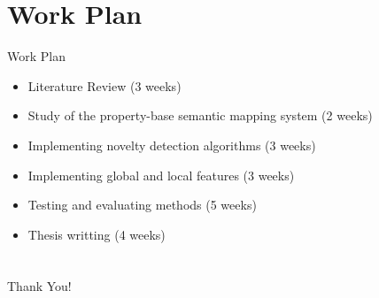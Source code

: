 \documentclass{beamer}
\begin{document}
\section{Work Plan}
\begin{frame}{Work Plan}
\begin{itemize}
\item Literature Review (3 weeks)
\item Study of the property-base semantic mapping system (2 weeks)
\item Implementing novelty detection algorithms (3 weeks)
\item Implementing global and local features (3 weeks)
\item Testing and evaluating methods (5 weeks)
\item Thesis writting (4 weeks)
\end{itemize}
\end{frame}

\section{}
\begin{frame}{Thank You!}
 \titlepage

\end{frame}
\end{document}
